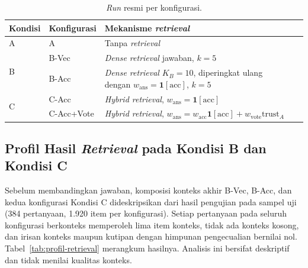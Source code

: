 \begin{table}[!htbp]
\centering
\small
\caption{\emph{Run} resmi per konfigurasi.}
\label{tab:daftar-run}
\renewcommand{\arraystretch}{1.2}
\begin{tabularx}{\textwidth}{|l|l|>{\raggedright\arraybackslash}X|>{\raggedright\arraybackslash}p{3.4cm}|}
\hline
\textbf{Kondisi} & \textbf{Konfigurasi} & \textbf{Mekanisme \emph{retrieval}}  \\
\hline
A & A & Tanpa \emph{retrieval}  \\
\hline
\multirow{2}{*}{B} & B-Vec & \emph{Dense retrieval} jawaban, $k=5$  \\
\cline{2-4}
 & B-Acc & \emph{Dense retrieval} $K_B=10$, diperingkat ulang dengan $w_{\mathrm{ans}}=\mathbf{1}[\mathrm{acc}]$, $k=5$  \\
\hline
\multirow{2}{*}{C} & C-Acc & \emph{Hybrid retrieval}, $w_{\mathrm{ans}}=\mathbf{1}[\mathrm{acc}]$  \\
\cline{2-4}
 & C-Acc+Vote & \emph{Hybrid retrieval}, $w_{\mathrm{ans}}=w_{\mathrm{acc}}\mathbf{1}[\mathrm{acc}]+w_{\mathrm{vote}}\mathrm{trust}_A$  \\
\hline
\end{tabularx}
\end{table}

\subsection{Profil Hasil \emph{Retrieval} pada Kondisi B dan Kondisi C}
\label{subsec:profil-retrieval}

Sebelum membandingkan jawaban, komposisi konteks akhir B-Vec, B-Acc, dan kedua konfigurasi Kondisi C dideskripsikan dari hasil pengujian pada sampel uji (384 pertanyaan, 1.920 item per konfigurasi). Setiap pertanyaan pada seluruh konfigurasi berkonteks memperoleh lima item konteks, tidak ada konteks kosong, dan irisan konteks maupun kutipan dengan himpunan pengecualian bernilai nol. Tabel~\ref{tab:profil-retrieval} merangkum hasilnya. Analisis ini bersifat deskriptif dan tidak menilai kualitas konteks.

